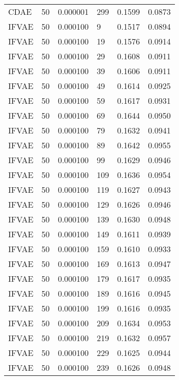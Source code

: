\begin{tabular}{llrlrr}
    CDAE &   50 &  0.000001 &   299 &  0.1599 &       0.0873 \\
   IFVAE &   50 &  0.000100 &     9 &  0.1517 &       0.0894 \\
   IFVAE &   50 &  0.000100 &    19 &  0.1576 &       0.0914 \\
   IFVAE &   50 &  0.000100 &    29 &  0.1608 &       0.0911 \\
   IFVAE &   50 &  0.000100 &    39 &  0.1606 &       0.0911 \\
   IFVAE &   50 &  0.000100 &    49 &  0.1614 &       0.0925 \\
   IFVAE &   50 &  0.000100 &    59 &  0.1617 &       0.0931 \\
   IFVAE &   50 &  0.000100 &    69 &  0.1644 &       0.0950 \\
   IFVAE &   50 &  0.000100 &    79 &  0.1632 &       0.0941 \\
   IFVAE &   50 &  0.000100 &    89 &  0.1642 &       0.0955 \\
   IFVAE &   50 &  0.000100 &    99 &  0.1629 &       0.0946 \\
   IFVAE &   50 &  0.000100 &   109 &  0.1636 &       0.0954 \\
   IFVAE &   50 &  0.000100 &   119 &  0.1627 &       0.0943 \\
   IFVAE &   50 &  0.000100 &   129 &  0.1626 &       0.0946 \\
   IFVAE &   50 &  0.000100 &   139 &  0.1630 &       0.0948 \\
   IFVAE &   50 &  0.000100 &   149 &  0.1611 &       0.0939 \\
   IFVAE &   50 &  0.000100 &   159 &  0.1610 &       0.0933 \\
   IFVAE &   50 &  0.000100 &   169 &  0.1613 &       0.0947 \\
   IFVAE &   50 &  0.000100 &   179 &  0.1617 &       0.0935 \\
   IFVAE &   50 &  0.000100 &   189 &  0.1616 &       0.0945 \\
   IFVAE &   50 &  0.000100 &   199 &  0.1616 &       0.0935 \\
   IFVAE &   50 &  0.000100 &   209 &  0.1634 &       0.0953 \\
   IFVAE &   50 &  0.000100 &   219 &  0.1632 &       0.0957 \\
   IFVAE &   50 &  0.000100 &   229 &  0.1625 &       0.0944 \\
   IFVAE &   50 &  0.000100 &   239 &  0.1626 &       0.0948 \\

\end{tabular}
